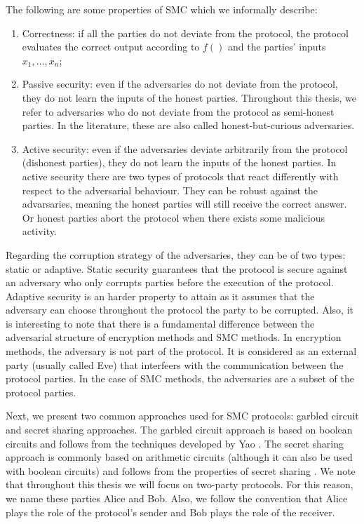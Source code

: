 The following are some properties of SMC which we informally describe:

\begin{enumerate}
\item Correctness: if all the parties do not deviate from the protocol, the protocol evaluates the correct output according to $f()$ and the parties' inputs $x_1, \ldots, x_n$;

\item Passive security: even if the adversaries do not deviate from the protocol, they do not learn the inputs of the honest parties. Throughout this thesis, we refer to adversaries who do not deviate from the protocol as semi-honest parties. In the literature, these are also called honest-but-curious adversaries.

\item Active security: even if the adversaries deviate arbitrarily from the protocol (dishonest parties), they do not learn the inputs of the honest parties. In active security there are two types of protocols that react differently with respect to the adversarial behaviour. They can be robust against the advarsaries, meaning the honest parties will still receive the correct answer. Or honest parties abort the protocol when there exists some malicious activity.
\end{enumerate}

Regarding the corruption strategy of the adversaries, they can be of two types: static or adaptive. Static security guarantees that the protocol is secure against an adversary who only corrupts parties before the execution of the protocol. Adaptive security is an harder property to attain as it assumes that the adversary can choose throughout the protocol the party to be corrupted. Also, it is interesting to note that there is a fundamental difference between the adversarial structure of encryption methods and SMC methods. In encryption methods, the adversary is not part of the protocol. It is considered as an external party (usually called Eve) that interfeers with the communication between the protocol parties. In the case of SMC methods, the adversaries are a subset of the protocol parties.

Next, we present two common approaches used for SMC protocols: garbled circuit and secret sharing approaches. The garbled circuit approach is based on boolean circuits and follows from the techniques developed by Yao \cite{Yao82}. The secret sharing approach is commonly based on arithmetic circuits (although it can also be used with boolean circuits) and follows from the properties of secret sharing \cite{BGW88, CCD88}. We note that throughout this thesis we will focus on two-party protocols. For this reason, we name these parties Alice and Bob. Also, we follow the convention that Alice plays the role of the protocol's sender and Bob plays the role of the receiver. 

